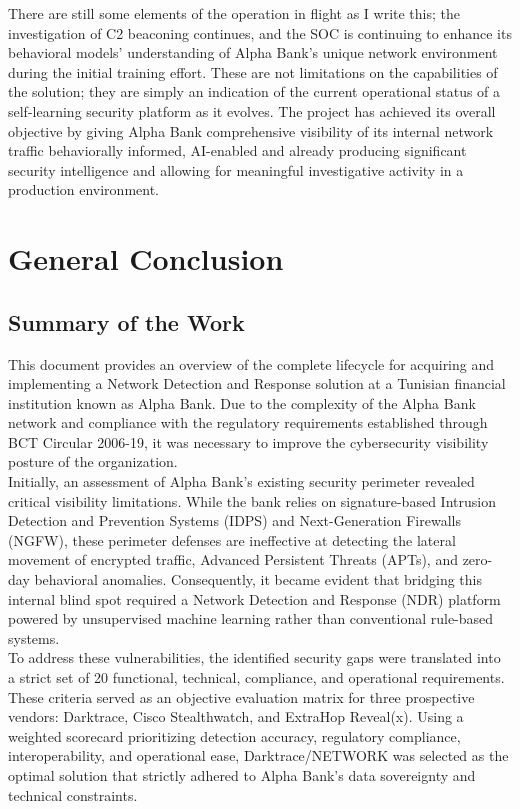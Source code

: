 \documentclass[12pt,a4paper]{report}
\begin{document}
There are still some elements of the operation in flight as I write this; the investigation of C2 beaconing continues, and the SOC is continuing to enhance its behavioral models' understanding of Alpha Bank's unique network environment during the initial training effort. These are not limitations on the capabilities of the solution; they are simply an indication of the current operational status of a self-learning security platform as it evolves. The project has achieved its overall objective by giving Alpha Bank comprehensive visibility of its internal network traffic behaviorally informed, AI-enabled and already producing significant security intelligence and allowing for meaningful investigative activity in a production environment.


\chapter*{General Conclusion}
\section*{Summary of the Work}

This document provides an overview of the complete lifecycle for acquiring and implementing a Network Detection and Response solution at a Tunisian financial institution known as Alpha Bank. Due to the complexity of the Alpha Bank network and compliance with the regulatory requirements established through BCT Circular 2006-19, it was necessary to improve the cybersecurity visibility posture of the organization.\\

Initially, an assessment of Alpha Bank's existing security perimeter revealed critical visibility limitations. While the bank relies on signature-based Intrusion Detection and Prevention Systems (IDPS) and Next-Generation Firewalls (NGFW), these perimeter defenses are ineffective at detecting the lateral movement of encrypted traffic, Advanced Persistent Threats (APTs), and zero-day behavioral anomalies. Consequently, it became evident that bridging this internal blind spot required a Network Detection and Response (NDR) platform powered by unsupervised machine learning rather than conventional rule-based systems.\\

To address these vulnerabilities, the identified security gaps were translated into a strict set of 20 functional, technical, compliance, and operational requirements. These criteria served as an objective evaluation matrix for three prospective vendors: Darktrace, Cisco Stealthwatch, and ExtraHop Reveal(x). Using a weighted scorecard prioritizing detection accuracy, regulatory compliance, interoperability, and operational ease, Darktrace/NETWORK was selected as the optimal solution that strictly adhered to Alpha Bank's data sovereignty and technical constraints.\\
\end{document}
